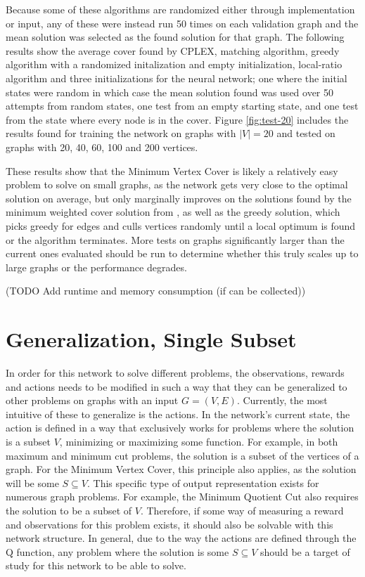 \documentclass{article}
\begin{document}
Because some of these algorithms are randomized either through implementation or input, any of these were instead run 50 times on each validation graph and the mean solution was selected as the found solution for that graph. The following results show the average cover found by CPLEX, matching algorithm, greedy algorithm with a randomized initalization and empty initialization, local-ratio algorithm and three initializations for the neural network; one where the initial states were random in which case the mean solution found was used over 50 attempts from random states, one test from an empty starting state, and one test from the state where every node is in the cover. Figure \ref{fig:test-20} includes the results found for training the network on graphs with $|V| = 20$ and tested on graphs with 20, 40, 60, 100 and 200 vertices.

These results show that the Minimum Vertex Cover is likely a relatively easy problem to solve on small graphs, as the network gets very close to the optimal solution on average, but only marginally improves on the solutions found by the minimum weighted cover solution from \cite{min-weighted-cover-bar}, as well as the greedy solution, which picks greedy for edges and culls vertices randomly until a local optimum is found or the algorithm terminates. More tests on graphs significantly larger than the current ones evaluated should be run to determine whether this truly scales up to large graphs or the performance degrades.

(TODO Add runtime and memory consumption (if can be collected))

\section{Generalization, Single Subset}\label{sec:generalization-single-subset}

In order for this network to solve different problems, the observations, rewards and actions needs to be modified in such a way that they can be generalized to other problems on graphs with an input $G = (V, E)$. Currently, the most intuitive of these to generalize is the actions. In the network's current state, the action is defined in a way that exclusively works for problems where the solution is a subset $V$, minimizing or maximizing some function. For example, in both maximum and minimum cut problems, the solution is a subset of the vertices of a graph. For the Minimum Vertex Cover, this principle also applies, as the solution will be some $S \subseteq V$. This specific type of output representation exists for numerous graph problems. For example, the Minimum Quotient Cut also requires the solution to be a subset of $V$. Therefore, if some way of measuring a reward and observations for this problem exists, it should also be solvable with this network structure. In general, due to the way the actions are defined through the Q function, any problem where the solution is some $S \subseteq V$ should be a target of study for this network to be able to solve. 
\end{document}
